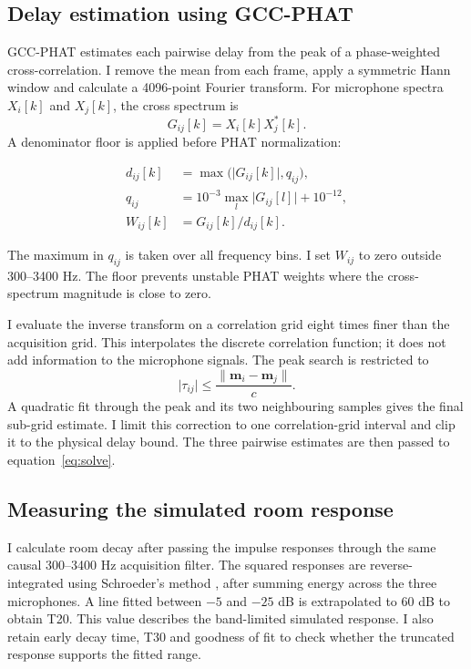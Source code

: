 \documentclass{edpsci}
\begin{document}
\subsection{Delay estimation using GCC-PHAT}

GCC-PHAT estimates each pairwise delay from the peak of a phase-weighted cross-correlation. I remove the mean from each frame, apply a symmetric Hann window and calculate a 4096-point Fourier transform. For microphone spectra $X_i[k]$ and $X_j[k]$, the cross spectrum is
\begin{equation}
	G_{ij}[k]=X_i[k]X_j^*[k].
\end{equation}
A denominator floor is applied before PHAT normalization:
\begin{linenomath}
\begin{align}
	d_{ij}[k]
	&=
	\max\bigl(\lvert G_{ij}[k]\rvert,q_{ij}\bigr),\\
	q_{ij}
	&=
	10^{-3}\max_l\lvert G_{ij}[l]\rvert+10^{-12},\\
	W_{ij}[k]
	&=
	G_{ij}[k]/d_{ij}[k].
\end{align}
\end{linenomath}
The maximum in $q_{ij}$ is taken over all frequency bins. I set $W_{ij}$ to zero outside 300--3400 Hz. The floor prevents unstable PHAT weights where the cross-spectrum magnitude is close to zero.

I evaluate the inverse transform on a correlation grid eight times finer than the acquisition grid. This interpolates the discrete correlation function; it does not add information to the microphone signals. The peak search is restricted to
\begin{equation}
	\lvert\tau_{ij}\rvert
	\leq
	\frac{\lVert\mathbf{m}_i-\mathbf{m}_j\rVert}{c}.
\end{equation}
A quadratic fit through the peak and its two neighbouring samples gives the final sub-grid estimate. I limit this correction to one correlation-grid interval and clip it to the physical delay bound. The three pairwise estimates are then passed to equation~\ref{eq:solve}.

\subsection{Measuring the simulated room response}

I calculate room decay after passing the impulse responses through the same causal 300--3400 Hz acquisition filter. The squared responses are reverse-integrated using Schroeder's method \citep{schroeder}, after summing energy across the three microphones. A line fitted between $-5$ and $-25$ dB is extrapolated to 60 dB to obtain T20. This value describes the band-limited simulated response. I also retain early decay time, T30 and goodness of fit to check whether the truncated response supports the fitted range.
\end{document}
